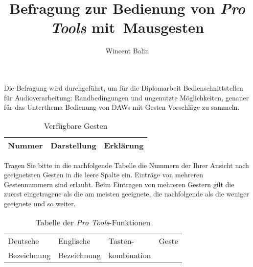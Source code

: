 \documentclass[11pt,a4paper,notitlepage]{article}
\author{Wincent Balin}
\title{Befragung zur Bedienung von \emph{Pro Tools} mit~Mausgesten}
\begin{document}
\maketitle

Die Befragung wird durchgeführt, um für die Diplomarbeit
\textsf{Bedienschnittstellen für Audioverarbeitung: Randbedingungen und ungenutzte Möglichkeiten},
genauer für das Unterthema \textsf{Bedienung von DAWs mit Gesten} Vorschläge zu sammeln.

\begin{table}[ht] \label{tab:Gestures}
\centering
\begin{tabular}{|l|l|l|} \hline
Nummer & Darstellung & Erklärung \\ \hline \hline
\end{tabular}
\caption{Verfügbare Gesten}
\end{table}

Tragen Sie bitte in die nachfolgende Tabelle die Nummern der Ihrer Ansicht nach geeignetsten Gesten
in die leere Spalte ein. Einträge von mehreren Gestennummern sind erlaubt. Beim Eintragen von mehreren
Gestern gilt die zuerst eingetragene als die am meisten geeignete, die nachfolgende als die weniger geeignete
und so weiter.

\begin{table}[ht] \label{tab:Functions}
\centering
\begin{tabular}{|l|l|l|l|} \hline
Deutsche & Englische & Tasten- & Geste \\
Bezeichnung & Bezeichnung & kombination &  \\ \hline \hline
\end{tabular}
\caption{Tabelle der \emph{Pro Tools}-Funktionen}
\end{table}
\end{document}

